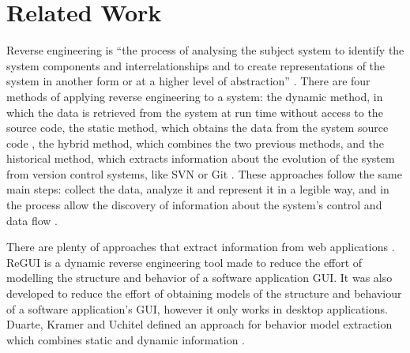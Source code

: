 \documentclass[10pt, conference, compsocconf]{IEEEtran}
\begin{document}
\section{Related Work}\label{sec:sota}

Reverse engineering is ``the process of analysing the subject system to identify the system components and interrelationships and to create representations of the system in another form or at a higher level of abstraction'' \cite{chikofsky1990reverse}. There are four methods of applying reverse engineering to a system: the dynamic method, in which the data is retrieved from the system at run time without access to the source code, the static method, which obtains the data from the system source code \cite{systa1999dynamic}, the hybrid method, which combines the two previous methods, and the historical method, which extracts information about the evolution of the system
from version control systems, like SVN%
or Git%
\cite{canfora2011achievements}. These approaches follow the same main steps: collect the data, analyze it and represent it in a legible way, and in the process allow the discovery of information about the system's control and data flow \cite{pacione2003comparative}.

There are plenty of approaches that extract information from web applications \cite{sampath2007applying,amalfitano2010rich, andjelkovic2011trace,5556690,conf/fmics/PaivaFM07}. ReGUI \cite{coimbra2011reverse,coimbra2012dynamic} is a dynamic reverse engineering tool made to reduce the effort of modelling the structure and behavior of a software application GUI. It was also developed to reduce the effort of obtaining models of the structure and behaviour of a software application's GUI, however it only works in desktop applications. Duarte, Kramer and Uchitel defined an approach for behavior model extraction which combines static and dynamic information \cite{duarte2006model}.
\end{document}
